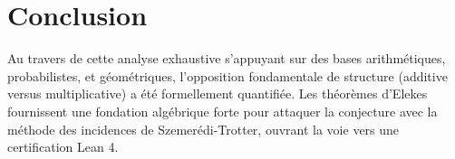 \documentclass[11pt,a4paper]{article}
\begin{document}
\section{Conclusion}
Au travers de cette analyse exhaustive s'appuyant sur des bases arithmétiques, probabilistes, et géométriques, l'opposition fondamentale de structure (additive versus multiplicative) a été formellement quantifiée. Les théorèmes d'Elekes fournissent une fondation algébrique forte pour attaquer la conjecture avec la méthode des incidences de Szemerédi-Trotter, ouvrant la voie vers une certification Lean 4.
\end{document}
